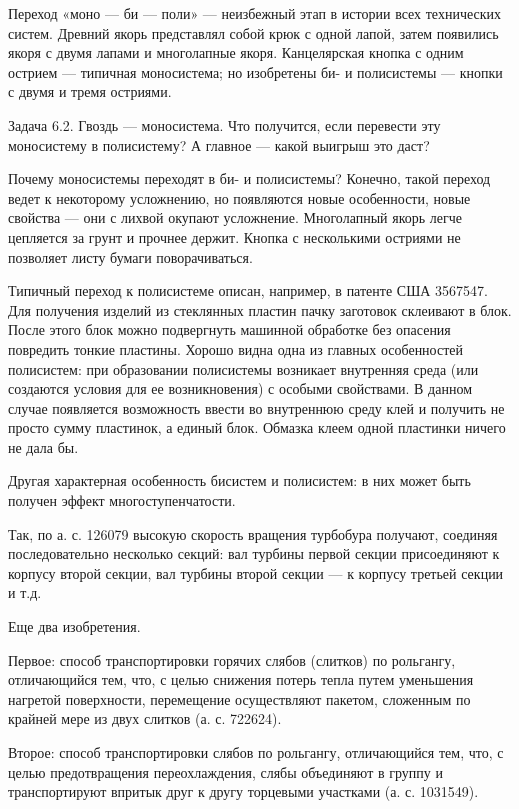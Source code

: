 Переход  «моно  —  би  —  поли»  —  неизбежный  этап  в  истории  всех
технических  систем.  Древний якорь  представлял  собой  крюк с  одной
лапой,  затем появились  якоря  с двумя  лапами  и многолапные  якоря.
Канцелярская  кнопка  с  одним  острием  —  типичная  моносистема;  но
изобретены би- и полисистемы — кнопки с двумя и тремя остриями.

Задача 6.2.  Гвоздь — моносистема.  Что получится, если  перевести эту
моносистему в полисистему? А главное — какой выигрыш это даст?

Почему  моносистемы  переходят в  би-  и  полисистемы? Конечно,  такой
переход   ведет  к   некоторому   усложнению,   но  появляются   новые
особенности,  новые  свойства  —  они  с  лихвой  окупают  усложнение.
Многолапный якорь легче цепляется за  грунт и прочнее держит. Кнопка с
несколькими остриями не позволяет листу бумаги поворачиваться.

Типичный  переход  к  полисистеме  описан,  например,  в  патенте  США
3567547. Для  получения изделий из стеклянных  пластин пачку заготовок
склеивают  в  блок.  После   этого  блок  можно  подвергнуть  машинной
обработке без опасения повредить тонкие пластины. Хорошо видна одна из
главных особенностей полисистем: при образовании полисистемы возникает
внутренняя  среда  (или  создаются  условия для  ее  возникновения)  с
особыми свойствами.  В данном случае появляется  возможность ввести во
внутреннюю среду клей  и получить не просто сумму  пластинок, а единый
блок. Обмазка клеем одной пластинки ничего не дала бы.

Другая характерная особенность бисистем и полисистем: в них может быть
получен эффект многоступенчатости.

Так, по  а. с.  126079 высокую  скорость вращения  турбобура получают,
соединяя последовательно  несколько секций: вал турбины  первой секции
присоединяют к  корпусу второй секции,  вал турбины второй секции  — к
корпусу третьей секции и т.д.


Еще два изобретения.

Первое: способ транспортировки горячих  слябов (слитков) по рольгангу,
отличающийся тем, что, с целью  снижения потерь тепла путем уменьшения
нагретой поверхности,  перемещение осуществляют пакетом,  сложенным по
крайней мере из двух слитков (а. с. 722624).

Второе: способ транспортировки слябов  по рольгангу, отличающийся тем,
что, с целью предотвращения  переохлаждения, слябы объединяют в группу
и  транспортируют впритык  друг  к другу  торцевыми  участками (а.  с.
1031549).

